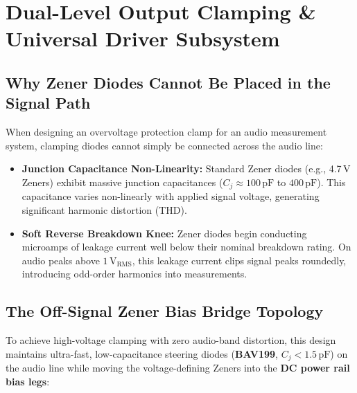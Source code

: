 \documentclass[11pt, letterpaper]{article}
\begin{document}
\section{Dual-Level Output Clamping \& Universal Driver Subsystem}

\subsection{Why Zener Diodes Cannot Be Placed in the Signal Path}
When designing an overvoltage protection clamp for an audio measurement system, clamping diodes cannot simply be connected across the audio line:
\begin{itemize}[leftmargin=1.5em]
    \item \textbf{Junction Capacitance Non-Linearity:} Standard Zener diodes (e.g., 4.7\,V Zeners) exhibit massive junction capacitances ($C_j \approx 100\,\text{pF}$ to $400\,\text{pF}$). This capacitance varies non-linearly with applied signal voltage, generating significant harmonic distortion (THD).
    \item \textbf{Soft Reverse Breakdown Knee:} Zener diodes begin conducting microamps of leakage current well below their nominal breakdown rating. On audio peaks above $1\,\text{V}_{\text{RMS}}$, this leakage current clips signal peaks roundedly, introducing odd-order harmonics into measurements.
\end{itemize}

\subsection{The Off-Signal Zener Bias Bridge Topology}
To achieve high-voltage clamping with zero audio-band distortion, this design maintains ultra-fast, low-capacitance steering diodes (\textbf{BAV199}, $C_j < 1.5\,\text{pF}$) on the audio line while moving the voltage-defining Zeners into the \textbf{DC power rail bias legs}:
\end{document}
